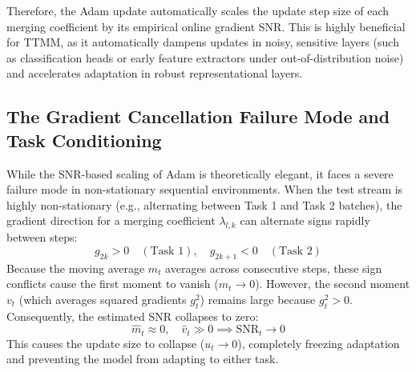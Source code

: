 \documentclass{article}
\theoremstyle{plain}
\theoremstyle{definition}
\theoremstyle{remark}
\begin{document}
Therefore, the Adam update automatically scales the update step size of each merging coefficient by its empirical online gradient SNR. This is highly beneficial for TTMM, as it automatically dampens updates in noisy, sensitive layers (such as classification heads or early feature extractors under out-of-distribution noise) and accelerates adaptation in robust representational layers.

\subsection{The Gradient Cancellation Failure Mode and Task Conditioning}
While the SNR-based scaling of Adam is theoretically elegant, it faces a severe failure mode in non-stationary sequential environments. When the test stream is highly non-stationary (e.g., alternating between Task 1 and Task 2 batches), the gradient direction for a merging coefficient $\lambda_{l, k}$ can alternate signs rapidly between steps:
\begin{equation}
    g_{2k} > 0 \quad (\text{Task 1}), \quad g_{2k+1} < 0 \quad (\text{Task 2})
\end{equation}
Because the moving average $m_t$ averages across consecutive steps, these sign conflicts cause the first moment to vanish ($m_t \to 0$).
However, the second moment $v_t$ (which averages squared gradients $g_t^2$) remains large because $g_t^2 > 0$.
Consequently, the estimated SNR collapses to zero:
\begin{equation}
    \hat{m}_t \approx 0, \quad \hat{v}_t \gg 0 \implies \text{SNR}_t \to 0
\end{equation}
This causes the update size to collapse ($u_t \to 0$), completely freezing adaptation and preventing the model from adapting to either task.
\end{document}
